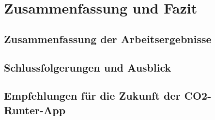 
\chapter{Zusammenfassung und Fazit }
\label{chapter:6}

\section{Zusammenfassung der Arbeitsergebnisse}

\section{Schlussfolgerungen und Ausblick }

\section{Empfehlungen für die Zukunft der CO2-Runter-App}
